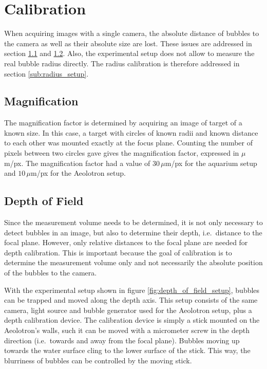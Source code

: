 	
	\section{Calibration}\label{calibration_setup}
		When acquiring images with a single camera, the absolute distance of bubbles to the camera as well as their absolute size are lost. These issues are addressed in section \ref{sub:magnification} and \ref{sub:depth_of_field_setup}. Also, the experimental setup does not allow to measure the real bubble radius directly. The radius calibration is therefore addressed in section \ref{sub:radius_setup}.
		\subsection{Magnification}\label{sub:magnification}
			The magnification factor is determined by acquiring an image of target of a known size. In this case, a target with circles of known radii and known distance to each other was mounted exactly at the focus plane. Counting the number of pixels between two circles gave gives the magnification factor, expressed in $\mu$m/px. The magnification factor had a value of $30\, \mu$m/px for the aquarium setup and $10 \, \mu$m/px for the Aeolotron setup. 
		\subsection{Depth of Field}\label{sub:depth_of_field_setup}
			Since the measurement volume needs to be determined, it is not only necessary to detect bubbles in an image, but also to determine their depth, i.e.\ distance to the focal plane. However, only relative distances to the focal plane are needed for depth calibration. This is important because the goal of calibration is to determine the measurement volume only and not necessarily the absolute position of the bubbles to the camera. 
			
			With the experimental setup shown in figure \ref{fig:depth_of_field_setup}, bubbles can be trapped and moved along the depth axis. This setup consists of the same camera, light source and bubble generator used for the Aeolotron setup, plus a depth calibration device. The calibration device is simply a stick mounted on the Aeolotron's walls, such it can be moved with a micrometer screw in the depth direction (i.e.\ towards and away from the focal plane). Bubbles moving up towards the water surface cling to the lower surface of the stick. This way, the blurriness of bubbles can be controlled by the moving stick.  
			

